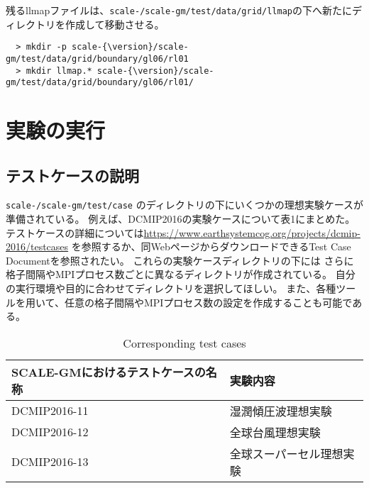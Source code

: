 \noindent 残るllmapファイルは、\texttt{scale-{\version}/scale-gm/test/data/grid/llmap}の下へ新たにディレクトリを作成して移動させる。

\begin{verbatim}
  > mkdir -p scale-{\version}/scale-gm/test/data/grid/boundary/gl06/rl01
  > mkdir llmap.* scale-{\version}/scale-gm/test/data/grid/boundary/gl06/rl01/
\end{verbatim}


\section{実験の実行}
\subsection{テストケースの説明}

\noindent \texttt{scale-{\version}/scale-gm/test/case} のディレクトリの下にいくつかの理想実験ケースが準備されている。
例えば、DCMIP2016の実験ケースについて表1にまとめた。
テストケースの詳細については\url{https://www.earthsystemcog.org/projects/dcmip-2016/testcases}
を参照するか、同WebページからダウンロードできるTest Case Documentを参照されたい。
これらの実験ケースディレクトリの下には
さらに格子間隔やMPIプロセス数ごとに異なるディレクトリが作成されている。
自分の実行環境や目的に合わせてディレクトリを選択してほしい。
また、各種ツールを用いて、任意の格子間隔やMPIプロセス数の設定を作成することも可能である。

 \begin{table}[b]
 \begin{center}
 \caption{Corresponding test cases}
 \begin{tabularx}{150mm}{|l|X|} \hline
 \rowcolor[gray]{0.9} SCALE-GMにおけるテストケースの名称 & 実験内容 \\ \hline
  DCMIP2016-11 & 湿潤傾圧波理想実験  \\ \hline
  DCMIP2016-12 & 全球台風理想実験 \\ \hline
  DCMIP2016-13 & 全球スーパーセル理想実験 \\ \hline
 \end{tabularx}
 \end{center}
 \end{table}


